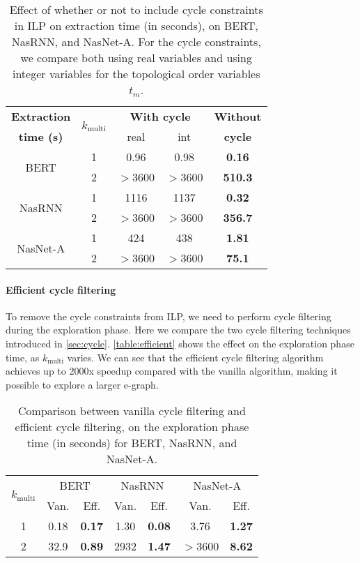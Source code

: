 \begin{table}[]
    \centering
    \begin{tabular}{ccccc}
    \hline
        {\bf Extraction} & \multirow{2}{*}{\bf $k_{\textrm{multi}}$} & \multicolumn{2}{c}{\bf With cycle} & {\bf Without} \\
        {\bf time (s)} & & real & int & {\bf cycle} \\
    \hline
       \multirow{2}{*}{BERT} & 1 & 0.96 & 0.98 & \textbf{0.16} \\
       & 2 & $>$3600 & $>$3600 & \textbf{510.3} \\
       \hline
       \multirow{2}{*}{NasRNN} & 1 & 1116 & 1137 & \textbf{0.32}  \\
       & 2 & $>$3600 & $>$3600 & \textbf{356.7}  \\
       \hline
       \multirow{2}{*}{NasNet-A} & 1 & 424 & 438 & \textbf{1.81}  \\
       & 2 & $>$3600 & $>$3600 & \textbf{75.1}  \\
    \hline
    \end{tabular}
    \caption{Effect of whether or not to include cycle constraints in ILP on extraction time (in seconds), on BERT, NasRNN, and NasNet-A.
    For the cycle constraints, we compare both using real variables and using integer variables for the topological order variables $t_m$. }
    \label{table:cycle}
\end{table}

\paragraph{Efficient cycle filtering}

To remove the cycle constraints from ILP, we need to perform cycle filtering during the exploration phase.
Here we compare the two cycle filtering techniques introduced in \autoref{sec:cycle}.
\autoref{table:efficient} shows the effect on the exploration phase time, as $k_{\textrm{multi}}$ varies.
We can see that the efficient cycle filtering algorithm achieves up to 2000x speedup compared with the vanilla algorithm, making it possible to explore a larger e-graph.

\begin{table}[]
    \centering
    \begin{tabular}{ccccccc}
    \hline
        \multirow{2}{*}{$k_{\textrm{multi}}$} & \multicolumn{2}{c}{BERT} & \multicolumn{2}{c}{NasRNN} & \multicolumn{2}{c}{NasNet-A} \\
        & Van. & Eff. & Van. & Eff. & Van. & Eff. \\
    \hline
        1 & 0.18 & \textbf{0.17} & 1.30 & \textbf{0.08} & 3.76 & \textbf{1.27} \\
        2 & 32.9 & \textbf{0.89} & 2932 & \textbf{1.47} & $>$3600 & \textbf{8.62} \\
    \hline
    \end{tabular}
    \caption{Comparison between vanilla cycle filtering and efficient cycle filtering, on the exploration phase time (in seconds) for BERT, NasRNN, and NasNet-A.}
    \label{table:efficient}
\end{table}



